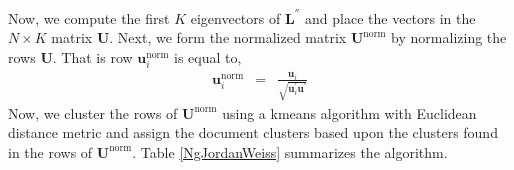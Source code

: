 \documentclass[11pt,letterpaper]{article}
\numberwithin{equation}{section}
\begin{document}
Now, we compute the first $K$ eigenvectors of $\boldsymbol{L}^{''}$
and place the vectors in the $N \times K$ matrix $\boldsymbol{U}$.
Next, we form the normalized matrix $\boldsymbol{U}^{\text{norm}}$
by normalizing the rows $\boldsymbol{U}$.  That is row
$\boldsymbol{u}^{\text{norm}}_{i}$ is equal to,
\begin{eqnarray}
\boldsymbol{u}^{\text{norm}}_{i} & = & \frac{\boldsymbol{u}_i
}{\sqrt{\boldsymbol{u}_i^{'} \boldsymbol{u}^{'} }} \nonumber
\end{eqnarray}
Now, we cluster the rows of $\boldsymbol{U}^{\text{norm}}$ using a
kmeans algorithm with Euclidean distance metric and assign the
document clusters based upon the clusters found in the rows of
$\boldsymbol{U}^{\text{norm}}$.  Table \ref{NgJordanWeiss}
summarizes the algorithm.
\begin{table}[hbt!]
\caption{Ng, Jordan, and Weiss (2003) Spectral Clustering}
\label{NgJordanWeiss} 
\end{table}
\end{document}

